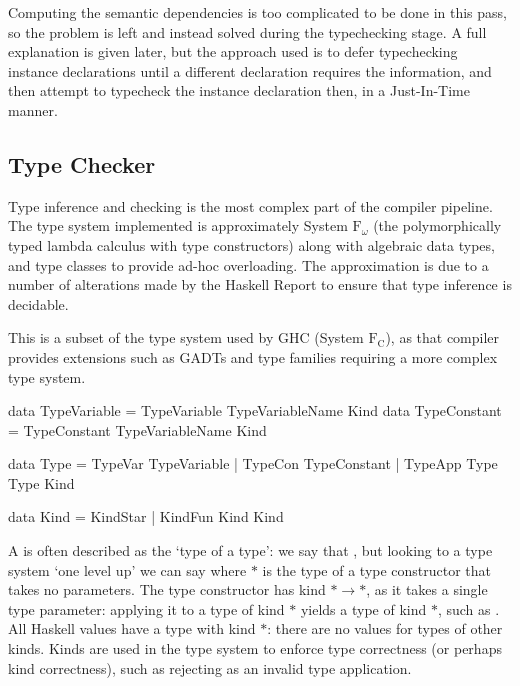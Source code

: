 \documentclass[dissertation.tex]{subfiles}
\begin{document}
{{{\begin{itemize}
{                Computing the semantic dependencies is too complicated to be done in this pass, so the problem is left
                and instead solved during the typechecking stage. A full explanation is given later, but the approach
                used is to defer typechecking instance declarations until a different declaration requires the
                information, and then attempt to typecheck the instance declaration then, in a Just-In-Time manner.

            }
            \end{itemize}
        }
    }
    \subsection{Type Checker}
    {

        Type inference and checking is the most complex part of the compiler pipeline. The type system implemented is
        approximately System \(\text{F}_\omega\) (the polymorphically typed lambda calculus with type constructors)
        along with algebraic data types, and type classes to provide ad-hoc overloading. The approximation is due to a
        number of alterations made by the Haskell Report to ensure that type inference is decidable.
        
        This is a subset of the type system used by GHC (System \(\text{F}_\text{C}\)), as that compiler provides
        extensions such as GADTs and type families requiring a more complex type system.

        \begin{haskellfigure}
        data TypeVariable = TypeVariable TypeVariableName Kind
        data TypeConstant = TypeConstant TypeVariableName Kind

        data Type = TypeVar TypeVariable
                  | TypeCon TypeConstant
                  | TypeApp Type Type Kind

        data Kind = KindStar
                  | KindFun Kind Kind
        \end{haskellfigure}

        A  is often described as the `type of a type': we say that , but looking to
        a type system `one level up' we can say  where \(*\) is the type of a type constructor
        that takes no parameters. The type constructor  has kind \(*\rightarrow*\), as it takes a single
        type parameter: applying it to a type of kind \(*\) yields a type of kind \(*\), such as
        . All Haskell values have a type with kind \(*\): there are no values for types of
        other kinds. Kinds are used in the type system to enforce type correctness (or perhaps kind correctness), such
        as rejecting  as an invalid type application.

}}
\end{document}
